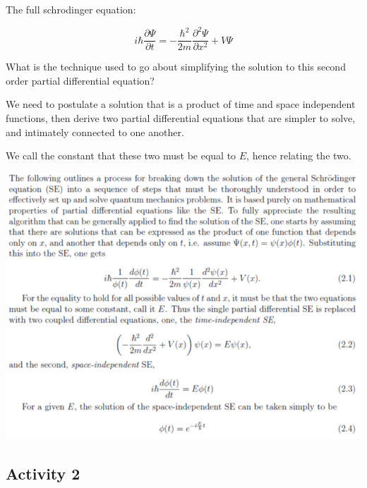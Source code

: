 \documentclass{article}
\begin{document}
The full schrodinger equation:

$$i \hbar \frac{\partial \Psi}{\partial t} = - \frac{\hbar^2}{2m} \frac{\partial^2 \Psi}{\partial x^2} + V \Psi $$

What is the technique used to go about simplifying the solution to this second order partial differential equation?

We need to postulate a solution that is a product of time and space independent functions, then derive two partial differential equations that are simpler to solve, and intimately connected to one another. 

We call the constant that these two must be equal to $E$, hence relating the two. 


\includegraphics[width = 0.8 \textwidth]{Lecture04/1.png}

\subsection{Activity 2}
\end{document}
